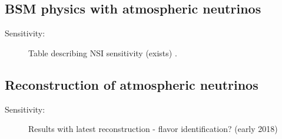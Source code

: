 \subsection{BSM physics with atmospheric neutrinos}
\label{sec:nonaccel-atm-bsm}

\begin{description}
\item[Sensitivity:] Table describing NSI sensitivity (exists) . 
\end{description}

\subsection{Reconstruction of atmospheric neutrinos}
\label{sec:nonaccel-atm-reco}
\begin{description}
\item[Sensitivity:] Results with latest reconstruction - flavor identification?  (early 2018) 
\end{description}